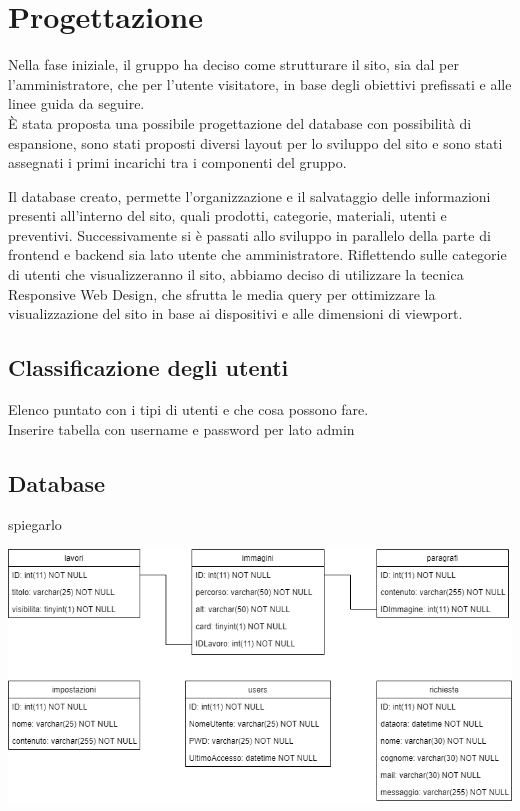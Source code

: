 \section{Progettazione}
Nella fase iniziale, il gruppo ha deciso come strutturare il sito, sia dal per l'amministratore, che per l'utente visitatore, in base degli obiettivi prefissati e alle linee guida da seguire.\\

È stata proposta una possibile progettazione del database con possibilità di espansione, sono stati proposti diversi layout per lo sviluppo del sito e sono stati assegnati i primi incarichi tra i componenti del gruppo.

Il database creato, permette l’organizzazione e il salvataggio delle informazioni presenti
all’interno del sito, quali prodotti, categorie, materiali, utenti e preventivi.
Successivamente si è passati allo sviluppo in parallelo della parte di frontend e backend sia
lato utente che amministratore. Riflettendo sulle categorie di utenti che visualizzeranno il
sito, abbiamo deciso di utilizzare la tecnica Responsive Web Design, che sfrutta le media
query per ottimizzare la visualizzazione del sito in base ai dispositivi e alle dimensioni di
viewport.

\subsection{Classificazione degli utenti}
Elenco puntato con i tipi di utenti e che cosa possono fare.
\\ Inserire tabella con username e password per lato admin

\subsection{Database}
spiegarlo \\
\begin{center}
\includegraphics[scale = 0.5]{../latex/images/db.png}\\[1.5cm]
\end{center}

